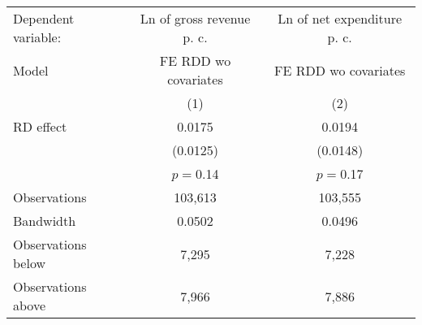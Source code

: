 \begin{tabular}{lcc}
  \toprule
 \midrule
Dependent variable: & Ln of gross revenue \acs{p. c.} & Ln of net expenditure \acs{p. c.} \\ 
 Model & \acs{FE} \acs{RDD} \acs{wo} covariates & \acs{FE} \acs{RDD} \acs{wo} covariates \\ 
   & (1) & (2) \\ 
   \midrule
\ac{RD} effect & 0.0175 & 0.0194 \\ 
   & (0.0125) & (0.0148) \\ 
   & $p=$0.14 & $p=$0.17 \\ 
   \midrule
  Observations & 103,613 & 103,555 \\ 
  Bandwidth & 0.0502 & 0.0496 \\ 
  Observations below & 7,295 & 7,228 \\ 
  Observations above & 7,966 & 7,886 \\ 
   \midrule
 \bottomrule
\end{tabular}
